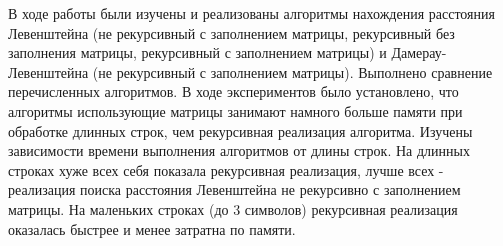 \Conclusion
    В ходе работы были изучены и реализованы алгоритмы нахождения
    расстояния Левенштейна (не рекурсивный с заполнением матрицы,
    рекурсивный без заполнения матрицы, рекурсивный с заполнением матрицы)
    и Дамерау-Левенштейна (не рекурсивный с заполнением матрицы). 
    Выполнено сравнение перечисленных алгоритмов. В ходе экспериментов
    было установлено, что алгоритмы использующие матрицы занимают намного больше памяти при 
    обработке длинных строк, чем рекурсивная реализация алгоритма.
    Изучены зависимости времени выполнения алгоритмов от длины
    строк. На длинных строках хуже всех себя показала рекурсивная реализация, 
    лучше всех - реализация поиска расстояния Левенштейна не рекурсивно с заполнением матрицы.
    На маленьких строках (до 3 символов) рекурсивная реализация оказалась быстрее и менее затратна по памяти.
